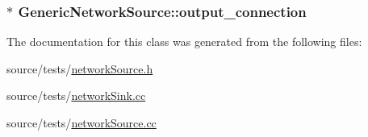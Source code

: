 \hypertarget{classGenericNetworkSource_394c482da644893d93513f202850cec0}{
\subsubsection[{output\_\-connection}]{$\ast$ {\bf GenericNetworkSource::output\_\-connection}}}
\label{classGenericNetworkSource_394c482da644893d93513f202850cec0}




The documentation for this class was generated from the following files:\begin{CompactItemize}
\item 
source/tests/\hyperlink{networkSource_8h}{networkSource.h}\item 
source/tests/\hyperlink{networkSink_8cc}{networkSink.cc}\item 
source/tests/\hyperlink{networkSource_8cc}{networkSource.cc}\end{CompactItemize}
